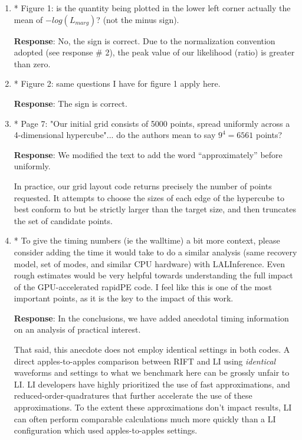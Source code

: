 \documentclass[onecolumn]{revtex4}
\begin{document}
\begin{enumerate}
\item * Figure 1: is the quantity being plotted in the lower left corner
actually the mean of $-log(L_{marg})$? (not the minus sign).

\noindent \textbf{Response}: No, the sign is correct.  Due to the normalization convention adopted (see response \# 2), the peak value
of our likelihood (ratio) is greater than zero.

\item * Figure 2: same questions I have for figure 1 apply here.

\noindent \textbf{Response}: The sign is correct.

\item * Page 7: "Our initial grid consists of 5000 points, spread uniformly
across a 4-dimensional hypercube"... do the authors mean to say $9^4 =
6561$ points?

\noindent \textbf{Response}: We modified the text to add the word ``approximately'' before uniformly.

In practice, our grid layout code returns precisely the number of points requested.  It attempts to choose the sizes of
each edge of the hypercube to best conform to but be strictly larger than the target size, and then truncates the set of
candidate points.  

\item * To give the timing numbers (ie the walltime) a bit more context,
please consider adding the time it would take to do a similar analysis
(same recovery model, set of modes, and similar CPU hardware) with
LALInference. Even rough estimates would be very helpful towards
understanding the full impact of the GPU-accelerated rapidPE code. I
feel like this is one of the most important points, as it is the key
to the impact of this work.

\noindent \textbf{Response}:  In the conclusions, we  have added anecdotal  timing
information on an analysis of practical interest.

That said, this anecdote does not employ identical settings in both codes.  A direct apples-to-apples comparison between RIFT and LI using \emph{identical} waveforms and settings to
what we benchmark here can be grossly unfair to LI.  LI developers
have highly prioritized the use of fast approximations, and reduced-order-quadratures that further accelerate the use of
these approximations.     To the extent these approximations don't impact results, LI can often perform comparable
calculations much more quickly than a LI configuration which used apples-to-apples settings.


\end{enumerate}
\end{document}
